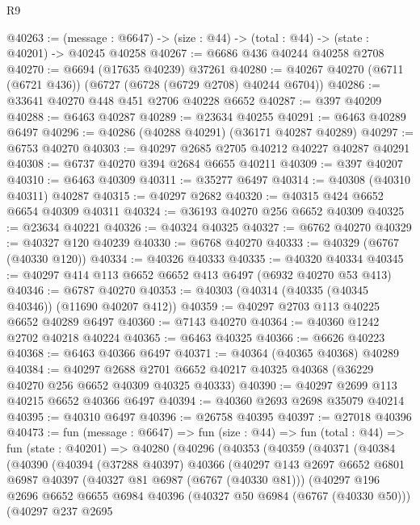 \begin{lexlean}{R9}
\begin{coremodule}
@40263 := (message : @6647) -> (size : @44) -> (total : @44) -> (state : @40201) -> @40245 @40258
@40267 := @6686 @436 @40244 @40258 @2708
@40270 := @6694 (@17635 @40239) @37261
@40280 := @40267 @40270 (@6711 (@6721 @436)) (@6727 (@6728 (@6729 @2708) @40244 @6704))
@40286 := @33641 @40270 @448 @451 @2706 @40228 @6652
@40287 := @397 @40209
@40288 := @6463 @40287
@40289 := @23634 @40255
@40291 := @6463 @40289 @6497
@40296 := @40286 (@40288 @40291) (@36171 @40287 @40289)
@40297 := @6753 @40270
@40303 := @40297 @2685 @2705 @40212 @40227 @40287 @40291
@40308 := @6737 @40270 @394 @2684 @6655 @40211
@40309 := @397 @40207
@40310 := @6463 @40309
@40311 := @35277 @6497
@40314 := @40308 (@40310 @40311) @40287
@40315 := @40297 @2682
@40320 := @40315 @424 @6652 @6654 @40309 @40311
@40324 := @36193 @40270 @256 @6652 @40309
@40325 := @23634 @40221
@40326 := @40324 @40325
@40327 := @6762 @40270
@40329 := @40327 @120 @40239
@40330 := @6768 @40270
@40333 := @40329 (@6767 (@40330 @120))
@40334 := @40326 @40333
@40335 := @40320 @40334
@40345 := @40297 @414 @113 @6652 @6652 @413 @6497 (@6932 @40270 @53 @413)
@40346 := @6787 @40270
@40353 := @40303 (@40314 (@40335 (@40345 @40346)) (@11690 @40207 @412))
@40359 := @40297 @2703 @113 @40225 @6652 @40289 @6497
@40360 := @7143 @40270
@40364 := @40360 @1242 @2702 @40218 @40224
@40365 := @6463 @40325
@40366 := @6626 @40223
@40368 := @6463 @40366 @6497
@40371 := @40364 (@40365 @40368) @40289
@40384 := @40297
    @2688
    @2701
    @6652
    @40217
    @40325
    @40368
    (@36229 @40270 @256 @6652 @40309 @40325 @40333)
@40390 := @40297 @2699 @113 @40215 @6652 @40366 @6497
@40394 := @40360 @2693 @2698 @35079 @40214
@40395 := @40310 @6497
@40396 := @26758 @40395
@40397 := @27018 @40396
@40473 := fun (message : @6647) =>
  fun (size : @44) =>
  fun (total : @44) =>
  fun (state : @40201) =>
  @40280
    (@40296
      (@40353
        (@40359
          (@40371
            (@40384
              (@40390
                (@40394
                  (@37288 @40397)
                  @40366
                  (@40297
                    @143
                    @2697
                    @6652
                    @6801
                    @6987
                    @40397
                    (@40327 @81 @6987 (@6767 (@40330 @81)))
                    (@40297
                      @196
                      @2696
                      @6652
                      @6655
                      @6984
                      @40396
                      (@40327 @50 @6984 (@6767 (@40330 @50)))
                      (@40297
                        @237
                        @2695

\end{coremodule}
\end{lexlean}
